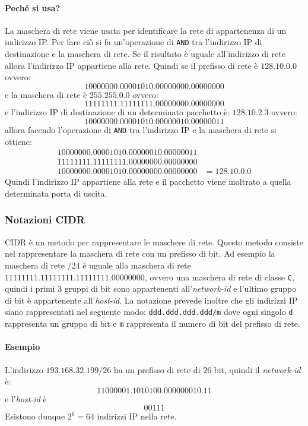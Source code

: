             \paragraph{Peché si usa?} La maschera di rete viene usata per identificare la rete di appartenenza di un indirizzo IP. Per fare ciò si fa un'operazione di \texttt{AND} tra l'indirizzo \Acrshort*{IP} di destinazione e la maschera di rete. Se il risultato è uguale all'indirizzo di rete allora l'indirizzo \Acrshort*{IP} appartiene alla rete. Quindi se il prefisso di rete è $128.10.0.0$ ovvero: \[10000000.00001010.00000000.00000000\] e la maschera di rete è $255.255.0.0$ ovvero: \[11111111.11111111.00000000.00000000\] e l'indirizzo \Acrshort*{IP} di destinazione di un determinato pacchetto è: $128.10.2.3$ ovvero: \[10000000.00001010.00000010.00000011\] allora facendo l'operazione di \texttt{AND} tra l'indirizzo \Acrshort*{IP} e la maschera di rete si ottiene: \[\begin{aligned}
                10000000.00001010.00000010.00000011 &\\
                11111111.11111111.00000000.00000000 &\\
                \hline
                10000000.00001010.00000000.00000000&=128.10.0.0
            \end{aligned}
            \] Quindi l'indirizzo \Acrshort*{IP} appartiene alla rete e il pacchetto viene inoltrato a quella determinata porta di uscita.
        \subsubsection{Notazioni \Acrshort*{CIDR}}
            \Acrfull*{CIDR} è un metodo per rappresentare le maschere di rete. Questo metodo consiste nel rappresentare la maschera di rete con un prefisso di bit. Ad esempio la maschera di rete $/24$ è uguale alla maschera di rete $11111111.11111111.11111111.00000000$, ovvero una maschera di rete di classe \texttt{C}, quindi i primi $3$ gruppi di bit sono appartenenti all'\textit{network-id} e l'ultimo gruppo di bit è appartenente all'\textit{host-id}. La notazione prevede inoltre che gli indirizzi \Acrshort*{IP} siano rappresentati nel seguente modo: \texttt{ddd.ddd.ddd.ddd/m} dove ogni singolo \texttt{d} rappresenta un gruppo di bit e \texttt{m} rappresenta il numero di bit del prefisso di rete.
            \paragraph{Esempio} L'indirizzo $193.168.32.199/26$ ha un prefisso di rete di $26$ bit, quindi il \textit{network-id} è: $$11000001.1010100.000000010.11$$ e l'\textit{host-id} è $$00111$$ Esistono dunque $2^6=64$ indirizzi \Acrshort*{IP} nella rete.
